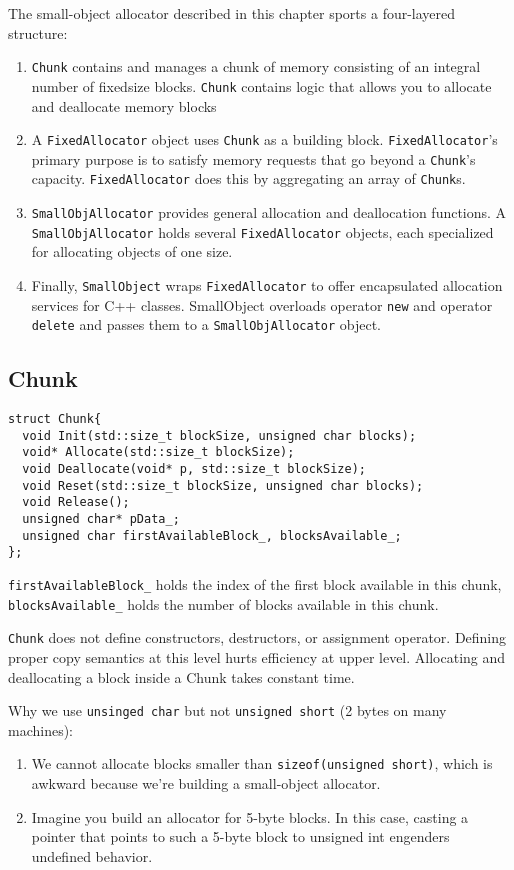The small-object allocator described in this chapter sports a
four-layered structure:
\begin{enumerate}
\item \texttt{Chunk} contains and manages a chunk of memory consisting
  of an integral number of fixedsize blocks. \texttt{Chunk} contains
  logic that allows you to allocate and deallocate memory blocks
\item A \texttt{FixedAllocator} object uses \texttt{Chunk} as a
  building block. \texttt{FixedAllocator}'s primary purpose is to
  satisfy memory requests that go beyond a \texttt{Chunk}'s
  capacity. \texttt{FixedAllocator} does this by aggregating an array
  of \texttt{Chunk}s.
\item \texttt{SmallObjAllocator} provides general allocation and
  deallocation functions. A \texttt{SmallObjAllocator} holds several
  \texttt{FixedAllocator} objects, each specialized for allocating
  objects of one size.
\item Finally, \texttt{SmallObject} wraps \texttt{FixedAllocator} to
  offer encapsulated allocation services for C++ classes. SmallObject
  overloads operator \texttt{new} and operator \texttt{delete} and
  passes them to a \texttt{SmallObjAllocator} object. 
\end{enumerate}

\subsection{Chunk}

\begin{verbatim}
struct Chunk{
  void Init(std::size_t blockSize, unsigned char blocks);
  void* Allocate(std::size_t blockSize);
  void Deallocate(void* p, std::size_t blockSize);
  void Reset(std::size_t blockSize, unsigned char blocks);
  void Release();
  unsigned char* pData_;
  unsigned char firstAvailableBlock_, blocksAvailable_;
};
\end{verbatim}

\texttt{firstAvailableBlock\_}  holds the index of the first block
available in this chunk, \texttt{blocksAvailable\_} holds the number of
blocks available in this chunk.

\texttt{Chunk} does not define constructors, destructors, or assignment
operator. Defining proper copy semantics at this level hurts
efficiency at upper level. Allocating and deallocating a
block inside a Chunk takes constant time.

Why we use \texttt{unsinged char} but not \texttt{unsigned short} (2
bytes on many machines):
\begin{enumerate}
\item We cannot allocate blocks smaller than \texttt{sizeof(unsigned
    short)}, which is awkward because we're building a small-object
  allocator.
\item Imagine you build an allocator for 5-byte blocks. In this case,
casting a pointer that points to such a 5-byte block to unsigned int
engenders undefined behavior.
\end{enumerate}


